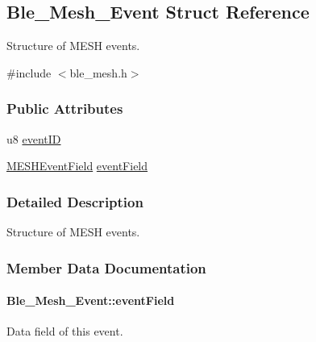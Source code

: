 \hypertarget{struct_ble___mesh___event}{}\subsection{Ble\+\_\+\+Mesh\+\_\+\+Event Struct Reference}
\label{struct_ble___mesh___event}


Structure of M\+E\+SH events.  




{\ttfamily \#include $<$ble\+\_\+mesh.\+h$>$}

\subsubsection*{Public Attributes}
\begin{DoxyCompactItemize}
\item 
u8 \hyperlink{struct_ble___mesh___event_aab4f7eb601ab71853bd41988f913c481}{event\+ID}
\item 
\hyperlink{union_m_e_s_h_event_field}{M\+E\+S\+H\+Event\+Field} \hyperlink{struct_ble___mesh___event_ae57373e759ba313e589b4208e7d7fcf0}{event\+Field}
\end{DoxyCompactItemize}


\subsubsection{Detailed Description}
Structure of M\+E\+SH events. 

\subsubsection{Member Data Documentation}
\paragraph[{\texorpdfstring{event\+Field}{eventField}}]{ Ble\+\_\+\+Mesh\+\_\+\+Event\+::event\+Field}\hypertarget{struct_ble___mesh___event_ae57373e759ba313e589b4208e7d7fcf0}{}\label{struct_ble___mesh___event_ae57373e759ba313e589b4208e7d7fcf0}
Data field of this event. 
